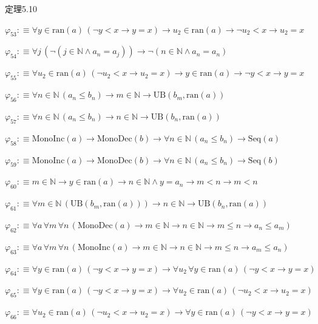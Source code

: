 \begin{fullproof}{定理5.10}
\begin{abbrevlist}
\item $\varphi_{53} :\equiv \forall y \in \mathrm{ran}(a)\,(\neg y < x \to y = x) \to u_{2} \in \mathrm{ran}(a) \to \neg u_{2} < x \to u_{2} = x$
\item $\varphi_{54} :\equiv \forall j\,(\neg (j \in \mathbb{N} \land a_{n} = a_{j})) \to \neg (n \in \mathbb{N} \land a_{n} = a_{n})$
\item $\varphi_{55} :\equiv \forall u_{2} \in \mathrm{ran}(a)\,(\neg u_{2} < x \to u_{2} = x) \to y \in \mathrm{ran}(a) \to \neg y < x \to y = x$
\item $\varphi_{56} :\equiv \forall n \in \mathbb{N}\,(a_{n} \leq b_{n}) \to m \in \mathbb{N} \to \mathrm{UB}(b_{m},\mathrm{ran}(a))$
\item $\varphi_{57} :\equiv \forall n \in \mathbb{N}\,(a_{n} \leq b_{n}) \to n \in \mathbb{N} \to \mathrm{UB}(b_{n},\mathrm{ran}(a))$
\item $\varphi_{58} :\equiv \mathrm{MonoInc}(a) \to \mathrm{MonoDec}(b) \to \forall n \in \mathbb{N}\,(a_{n} \leq b_{n}) \to \mathrm{Seq}(a)$
\item $\varphi_{59} :\equiv \mathrm{MonoInc}(a) \to \mathrm{MonoDec}(b) \to \forall n \in \mathbb{N}\,(a_{n} \leq b_{n}) \to \mathrm{Seq}(b)$
\item $\varphi_{60} :\equiv m \in \mathbb{N} \to y \in \mathrm{ran}(a) \to n \in \mathbb{N} \land y = a_{n} \to m < n \to m < n$
\item $\varphi_{61} :\equiv \forall m \in \mathbb{N}\,(\mathrm{UB}(b_{m},\mathrm{ran}(a))) \to n \in \mathbb{N} \to \mathrm{UB}(b_{n},\mathrm{ran}(a))$
\item $\varphi_{62} :\equiv \forall a\,\forall m\,\forall n\,(\mathrm{MonoDec}(a) \to m \in \mathbb{N} \to n \in \mathbb{N} \to m \leq n \to a_{n} \leq a_{m})$
\item $\varphi_{63} :\equiv \forall a\,\forall m\,\forall n\,(\mathrm{MonoInc}(a) \to m \in \mathbb{N} \to n \in \mathbb{N} \to m \leq n \to a_{m} \leq a_{n})$
\item $\varphi_{64} :\equiv \forall y \in \mathrm{ran}(a)\,(\neg y < x \to y = x) \to \forall u_{2}\,\forall y \in \mathrm{ran}(a)\,(\neg y < x \to y = x)$
\item $\varphi_{65} :\equiv \forall y \in \mathrm{ran}(a)\,(\neg y < x \to y = x) \to \forall u_{2} \in \mathrm{ran}(a)\,(\neg u_{2} < x \to u_{2} = x)$
\item $\varphi_{66} :\equiv \forall u_{2} \in \mathrm{ran}(a)\,(\neg u_{2} < x \to u_{2} = x) \to \forall y \in \mathrm{ran}(a)\,(\neg y < x \to y = x)$

\end{abbrevlist}
\end{fullproof}
